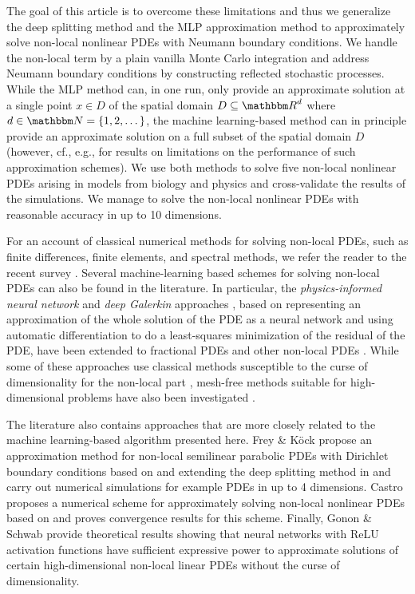 The goal of this article is to overcome these limitations and thus we generalize the deep splitting method and the MLP approximation method to approximately solve non-local nonlinear PDEs with Neumann boundary conditions. We handle the non-local term by a plain vanilla Monte Carlo integration and address Neumann boundary conditions by constructing reflected stochastic processes. While the MLP method can, in one run, only provide an approximate solution at a single point $x \in D$ of the spatial domain $D\subseteq\R^d$ where $d\in\N=\{1,2,\dots\}$, the machine learning-based method can in principle provide an approximate solution on a full subset of the spatial domain $D$ (however, cf., e.g., \citep{heinrich1998monte,heinrich1999monte,grohs2021proof} for results on limitations on the performance of such approximation schemes).
%
We use both methods to solve five non-local nonlinear PDEs arising in models from biology and physics and cross-validate the results of the simulations.
%
We manage to solve the non-local nonlinear PDEs with reasonable accuracy in up to 10 dimensions.

For an account of classical numerical methods for solving non-local PDEs, such as finite differences, finite elements, and spectral methods, we refer the reader to the recent survey \citep{delia2020numerical}. Several machine-learning based schemes for solving non-local PDEs can also be found in the literature. 
%
In particular, the \emph{physics-informed neural network} and \emph{deep Galerkin} approaches \citep{raissi2019physics,Sirignano2018dgm}, based on representing an approximation of the whole solution of the PDE as a neural network and using automatic differentiation to do a least-squares minimization of the residual of the PDE, have been extended to fractional PDEs and other non-local PDEs \citep{pang2019fpinns,lu2021deepxde,guo2022monte,alaradi2019extensions,yuan2022apinn}. While some of these approaches use classical methods susceptible to the curse of dimensionality for the non-local part \citep{pang2019fpinns,lu2021deepxde}, mesh-free methods suitable for high-dimensional problems have also been investigated \citep{guo2022monte,alaradi2019extensions,yuan2022apinn}. 

The literature also contains approaches that are more closely related to the machine learning-based algorithm presented here. Frey \& K\"ock \citep{frey2021deep,frey2022deep} propose an approximation method for non-local semilinear parabolic PDEs with Dirichlet boundary conditions based on and extending the deep splitting method in \citep{Beck2019} and carry out numerical simulations for example PDEs in up to 4 dimensions. Castro \citep{castro2021deep} proposes a numerical scheme for approximately solving non-local nonlinear PDEs based on \citep{hure2020deep} and proves convergence results for this scheme.
%
Finally, Gonon \& Schwab \citep{gonon2021deep} provide theoretical results showing that neural networks with ReLU activation functions have sufficient expressive power to approximate solutions of certain high-dimensional non-local linear PDEs without the curse of dimensionality.

